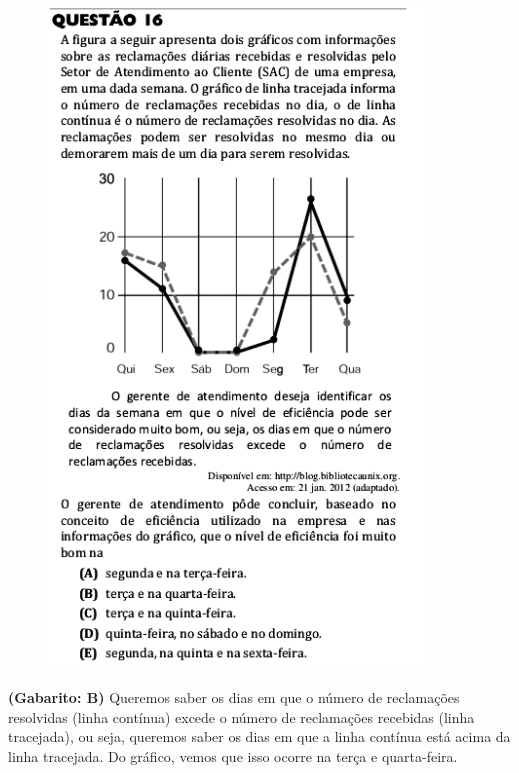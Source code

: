 \documentclass[a4paper]{article}
\begin{document}
\begin{figure}[H]
	\begin{center}
		\includegraphics[width=10cm]{L1Q16.png}
	\end{center}
\end{figure}
\par\textbf{(Gabarito: B)} Queremos saber os dias em que o número de reclamações resolvidas (linha contínua) excede o número de reclamações recebidas (linha tracejada), ou seja, queremos saber os dias em que a linha contínua está acima da linha tracejada. Do gráfico, vemos que isso ocorre na terça e quarta-feira.
\end{document}
